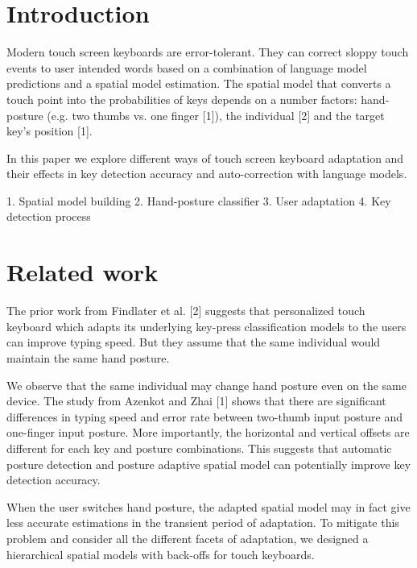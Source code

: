 \documentclass{sigchi}
\begin{document}

\section{Introduction}
Modern touch screen keyboards are error-tolerant. They can correct sloppy touch
events to user intended words based on a combination of language model predictions and a spatial model estimation. 
The spatial model that converts a touch point into the probabilities of keys depends on a number factors: hand-posture (e.g. two thumbs vs. one finger [1]), the individual [2] and the target key’s position [1].

In this paper we explore different ways of touch screen keyboard adaptation and
their effects in key detection accuracy and auto-correction with language
models.

 1. Spatial model building
2. Hand-posture classifier
3. User adaptation
4. Key detection process

\section{Related work}


The prior work from Findlater et al. [2] suggests that personalized touch keyboard which adapts its underlying key-press classification models to the users can improve typing speed.  But they assume that the same individual would maintain the same hand posture. 

We observe that the same individual may change hand posture even on the same device. The study from Azenkot and Zhai [1] shows that there are significant differences in typing speed and error rate between two-thumb input posture and one-finger input posture. More importantly, the horizontal and vertical offsets are different for each key and posture combinations. This suggests that automatic posture detection and posture adaptive spatial model can potentially improve key detection accuracy.

When the user switches hand posture, the adapted spatial model may in fact give less accurate estimations in the transient period of adaptation. To mitigate this problem and consider all the different facets of adaptation, we designed a hierarchical spatial models with back-offs for touch keyboards.  
\end{document}
